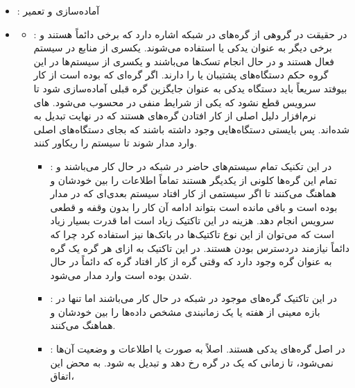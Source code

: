 \begin{itemize}
    \item {}: آماده‌سازی و تعمیر
    \item \begin{itemize}
        \item {}: در حقیقت در گروهی از گره‌های در شبکه اشاره
        دارد که برخی دائماً  هستند و برخی دیگر به عنوان یدکی یا
         استفاده می‌شوند. یکسری از منابع در سیستم فعال هستند و در حال
        انجام تسک‌ها می‌باشند و یکسری از سیستم‌ها در این گروه حکم دستگاه‌های
        پشتیبان یا  را دارند. اگر گره‌ای که  بوده است از
        کار بیوفتد سریعاً باید دستگاه یدکی به عنوان جایگزین گره قبلی آماده‌سازی
        شود تا سرویس قطع نشود که یکی از شرایط منفی در  محسوب
        می‌شود. های نرم‌افزار دلیل اصلی از کار افتادن گره‌های
         هستند که در نهایت تبدیل به  شده‌اند. پس بایستی
        دستگاه‌هایی وجود داشته باشند که بجای دستگاه‌های اصلی وارد مدار شوند تا
        سیستم را ریکاور کنند.
        \begin{itemize}
            \item {}: در این تکنیک تمام
            سیستم‌های حاضر در شبکه در حال کار می‌باشند و تمام این گره‌ها کلونی
            از یکدیگر هستند تماماً اطلاعات را بین خودشان  و هماهنگ
            می‌کنند تا اگر سیستمی از کار افتاد سیستم بعدی‌ای که در مدار بوده است
            و باقی مانده است بتواند ادامه آن کار را بدون وقفه و قطعی سرویس انجام
            دهد. هزینه در این تاکتیک زیاد است اما قدرت  بسیار
            زیاد است که می‌توان از این نوع تاکتیک‌ها در باتک‌ها نیز استفاده کرد
            چرا که دائماً نیازمند دردسترس بودن هستند. در این تاکتیک به ازای هر
            گره یک گره به عنوان گره  وجود دارد که وقتی گره
             از کار افتاد گره  که دائماً در حال 
            شدن بوده است وارد مدار می‌شود.
            \item {}: در این تاکتیک گره‌های
            موجود در شبکه در حال کار می‌باشند اما تنها در بازه معینی از هفته یا
            یک زمانبندی مشخص داده‌ها را بین خودشان  و هماهنگ می‌کنند.
            \item {}: در اصل گره‌های یدکی  هستند. اصلاً به صورت  یا  اطلاعات و
            وضعیت آن‌ها  نمی‌شود، تا زمانی که یک  در گره
             رخ دهد و تبدیل به  شود. به محض این اتفاق،

\end{itemize}
\end{itemize}
\end{itemize}
